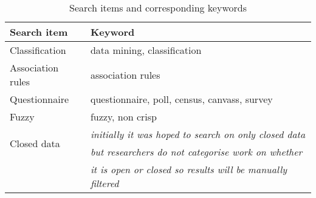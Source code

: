 \begin{table}[h!]
  \begin{center}
    \caption{Search items and corresponding keywords}
    \label{tab:table1}
    \begin{tabular}{l|l} %
      \textbf{Search item}         & \textbf{Keyword}                                                   \\
      \hline
      Classification               & data mining, classification                                        \\
      \hline
      Association rules            & association rules                                                  \\
      \hline
      Questionnaire                & questionnaire, poll, census, canvass, survey                       \\
      \hline
      Fuzzy                        & fuzzy, non crisp                                                   \\
      \hline
      \multirow{2}{*}{Closed data} & \textit{initially it was hoped to search on only closed data}      \\
                                   & \textit{but researchers do not categorise work on whether}         \\
                                   & \textit{it is open or closed so results will be manually filtered} \\
    \end{tabular}
  \end{center}
\end{table}


